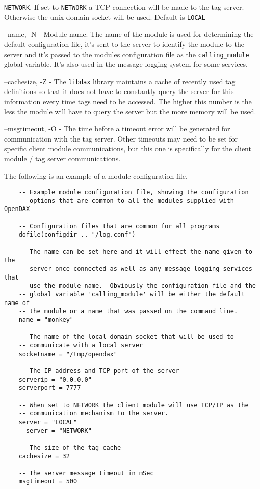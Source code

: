 \begin{list}{}{Command Line Options}
		\texttt{NETWORK}.  If set to \texttt{NETWORK} a TCP connection will be made to
		the tag server.  Otherwise the unix domain socket will be used.  Default is
		\texttt{LOCAL}
		\item[--name, -N] - Module name.  The name of the module is used for
		determining the default configuration file, it's sent to the server to identify
		the module to the server and it's passed to the modules configuration file as
		the \texttt{calling\_module} global variable.  It's also used in the message
		logging system for some services.
		\item[--cachesize, -Z] - The \texttt{libdax} library maintains a cache of
		recently used tag definitions so that it does not have to constantly query the
		server for this information every time tags need to be accessed.  The higher
		this number is the less the module will have to query the server but the more
		memory will be used.
		\item[--msgtimeout, -O] - The time before a timeout error will be generated for
		communication with the tag server.  Other timeouts may need to be set for
		specific client module communications, but this one is specifically for the
		client module / tag server communications.
	\end{list}

	The following is an example of a module configuration file.

	\begin{verbatim}
	-- Example module configuration file, showing the configuration
	-- options that are common to all the modules supplied with OpenDAX

	-- Configuration files that are common for all programs
	dofile(configdir .. "/log.conf")

	-- The name can be set here and it will effect the name given to the
	-- server once connected as well as any message logging services that
	-- use the module name.  Obviously the configuration file and the
	-- global variable 'calling_module' will be either the default name of
	-- the module or a name that was passed on the command line.
	name = "monkey"

	-- The name of the local domain socket that will be used to
	-- communicate with a local server
	socketname = "/tmp/opendax"

	-- The IP address and TCP port of the server
	serverip = "0.0.0.0"
	serverport = 7777

	-- When set to NETWORK the client module will use TCP/IP as the
	-- communication mechanism to the server.
	server = "LOCAL"
	--server = "NETWORK"

	-- The size of the tag cache
	cachesize = 32

	-- The server message timeout in mSec
	msgtimeout = 500
	\end{verbatim}

